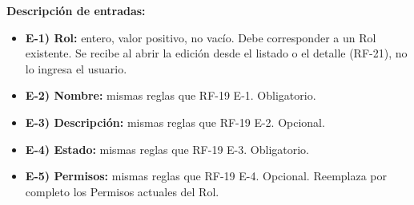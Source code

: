 \textbf{Descripci\'on de entradas:}
\begin{itemize}[label={}, leftmargin=1.5em]
  \item \textbf{E-1) Rol:} entero, valor positivo, no vac\'io. Debe corresponder a un Rol existente. Se recibe al abrir la edici\'on desde el listado o el detalle (RF-21), no lo ingresa el usuario.
  \item \textbf{E-2) Nombre:} mismas reglas que RF-19 E-1. Obligatorio.
  \item \textbf{E-3) Descripci\'on:} mismas reglas que RF-19 E-2. Opcional.
  \item \textbf{E-4) Estado:} mismas reglas que RF-19 E-3. Obligatorio.
  \item \textbf{E-5) Permisos:} mismas reglas que RF-19 E-4. Opcional. Reemplaza por completo los Permisos actuales del Rol.
\end{itemize}

